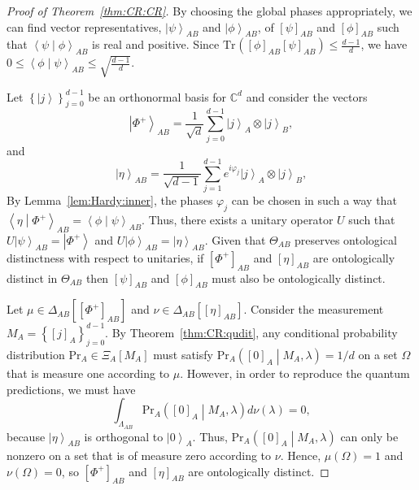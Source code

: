 \documentclass[DIV=calc,fontsize=12pt]{scrartcl} %
\theoremstyle{definition}
\theoremstyle{plain}
\newcommand{\Ket}[1]{\ensuremath{\left \vert #1 \right \rangle}}
\newcommand{\BraKet}[2]{\ensuremath{\left \langle #1 \middle \vert #2
\right \rangle}}
\newcommand{\Proj}[1]{\ensuremath{\left [ #1 \right ]}}
\newcommand{\Tr}[2][]{\ensuremath{\text{Tr}_{#1} \left ( #2 \right )}}
\begin{document}
\begin{proof}[Proof of Theorem~\ref{thm:CR:CR}]
By choosing the global phases appropriately, we can find vector
representatives, $\Ket{\psi}_{AB}$ and $\Ket{\phi}_{AB}$, of
$\Proj{\psi}_{AB}$ and $\Proj{\phi}_{AB}$ such that
$\BraKet{\psi}{\phi}_{AB}$ is real and positive.  Since
$\Tr{\Proj{\phi}_{AB}\Proj{\psi}_{AB}} \leq \frac{d-1}{d}$, we have
$0 \leq \BraKet{\phi}{\psi}_{AB} \leq \sqrt{\frac{d-1}{d}}$.

Let $\left \{ \Ket{j} \right \}_{j=0}^{d-1}$ be an orthonormal basis
for $\mathbb{C}^d$ and consider the vectors
\begin{equation}
\Ket{\Phi^+}_{AB} = \frac{1}{\sqrt{d}}\sum_{j=0}^{d-1} \Ket{j}_A
\otimes \Ket{j}_B,
\end{equation}
and
\begin{equation}
\Ket{\eta}_{AB} = \frac{1}{\sqrt{d-1}}\sum_{j=1}^{d-1} e^{i
\varphi_j} \Ket{j}_A \otimes \Ket{j}_B,
\end{equation}
By Lemma~\ref{lem:Hardy:inner}, the phases $\varphi_j$ can be chosen
in such a way that $\BraKet{\eta}{\Phi^+}_{AB} =
\BraKet{\phi}{\psi}_{AB}$.  Thus, there exists a unitary operator
$U$ such that $U \Ket{\psi}_{AB} = \Ket{\Phi^+}$ and
$U\Ket{\phi}_{AB} = \Ket{\eta}_{AB}$.  Given that $\Theta_{AB}$
preserves ontological distinctness with respect to unitaries, if
$\Proj{\Phi^+}_{AB}$ and $\Proj{\eta}_{AB}$ are ontologically
distinct in $\Theta_{AB}$ then $\Proj{\psi}_{AB}$ and
$\Proj{\phi}_{AB}$ must also be ontologically distinct.

Let $\mu \in \Delta_{AB} \left [ \Proj{\Phi^+}_{AB} \right ]$ and
$\nu \in \Delta_{AB} \left [ \Proj{\eta}_{AB} \right ]$.  Consider
the measurement $M_A = \left \{ \Proj{j}_A \right \}_{j=0}^{d-1}$.
By Theorem~\ref{thm:CR:qudit}, any conditional probability
distribution $\text{Pr}_A \in \Xi_A[M_A]$ must satisfy $\text{Pr}_A
\left ( \Proj{0}_A \middle | M_A, \lambda \right ) = 1/d$ on a set
$\Omega$ that is measure one according to $\mu$.  However, in order
to reproduce the quantum predictions, we must have
\begin{equation}
\int_{\Lambda_{AB}} \text{Pr}_A \left ( \Proj{0}_A \middle | M_A,
\lambda \right ) d\nu(\lambda) = 0,
\end{equation}
because $\Ket{\eta}_{AB}$ is orthogonal to $\Ket{0}_A$.  Thus,
$\text{Pr}_A \left ( \Proj{0}_A \middle | M_A, \lambda \right )$ can
only be nonzero on a set that is of measure zero according to $\nu$.
Hence, $\mu(\Omega) = 1$ and $\nu(\Omega) = 0$, so
$\Proj{\Phi^+}_{AB}$ and $\Proj{\eta}_{AB}$ are ontologically
distinct.
\end{proof}
\end{document}
